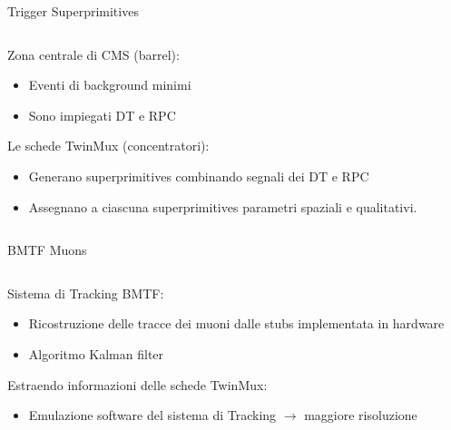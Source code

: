 \documentclass{beamer}
\begin{document}
\begin{frame}{Trigger Superprimitives}

\begin{columns}

    \begin{column}{0.5\textwidth}
    Zona centrale di CMS (barrel):
    \begin{itemize}
        \item Eventi di background minimi
        \item Sono impiegati DT e RPC
    \end{itemize}
    \vspace{0.5 cm}
    Le schede TwinMux (concentratori):
    \begin{itemize}
        \item Generano superprimitives combinando segnali dei DT e RPC
        \item Assegnano a ciascuna superprimitives parametri spaziali e qualitativi.
    \end{itemize}

    \end{column}
    \begin{column}{0.5\textwidth}
        \centering
    \end{column}
\end{columns}
    
\end{frame}


\begin{frame}{BMTF Muons}

\begin{columns}

    \begin{column}{0.5\textwidth}
    Sistema di Tracking BMTF:
    \begin{itemize}
        \item Ricostruzione delle tracce dei muoni dalle stubs implementata in hardware 
        \item Algoritmo Kalman filter
    \end{itemize}
    \vspace{0.3cm}
    Estraendo informazioni delle schede TwinMux:
    \begin{itemize}
        \item Emulazione software del sistema di Tracking $\rightarrow$ maggiore risoluzione
    \end{itemize}
    

    \end{column}
    \begin{column}{0.5\textwidth}
        \centering
    \end{column}
\end{columns}

\end{frame}
\end{document}
